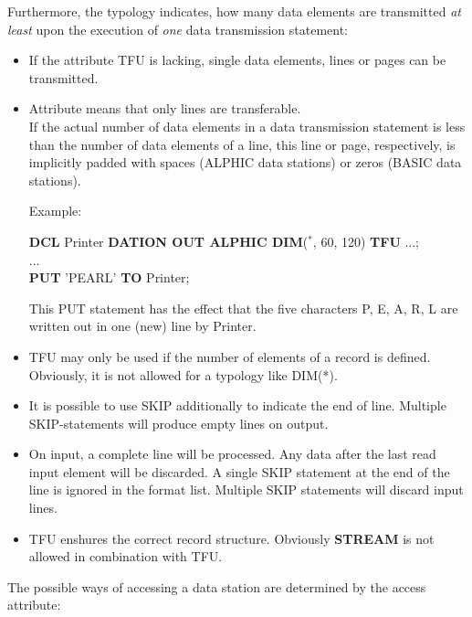 \begin{modified}
Furthermore, the typology indicates, how many data elements are
transmitted {\em at least} upon the execution of {\em one} data
transmission statement:
\begin{itemize}
\item If the attribute TFU is lacking, single data elements,
lines or pages can be transmitted.
\item Attribute 
 means that only lines are transferable.\\
If the actual number of data elements in a data transmission statement
is less than the number of data elements of a line, this line or
page, respectively, is implicitly padded with spaces (ALPHIC data
stations) or zeros (BASIC data stations).

Example:

{\bf DCL} Printer {\bf DATION OUT ALPHIC DIM}($^*$, 60, 120) {\bf TFU} ...;\\
... \\
{\bf PUT} 'PEARL' {\bf TO} Printer;

This PUT statement has the effect that the five characters P, E, A, R,
L are written out in one (new) line by Printer.
\item TFU may only be used if the number of elements of a record is defined. 
Obviously, it is not allowed for a typology like DIM(*).
\item It is possible to use  SKIP additionally to indicate the end of line.
Multiple SKIP-statements will produce empty lines on output.
\item On input, a complete line will be processed.  Any data after the last
read input  element will be discarded. A single SKIP statement at the end 
of the line is ignored in the format list. Multiple SKIP statements will
discard input lines.
\item TFU enshures the correct record structure. Obviously
{\bf STREAM} is not allowed in combination with TFU.
\end{itemize}
\end{modified}

The possible ways of accessing a data station are determined by the
access attribute:



